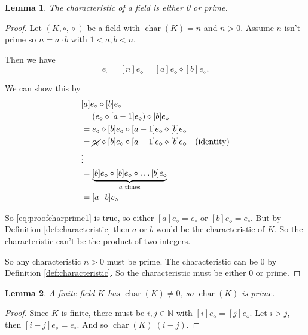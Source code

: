 \documentclass{article}
\newtheorem{lemma}{Lemma}
\newcommand{\NN}{\mathbb{N}}
\newcommand{\mchar}{\operatorname{char}}
\begin{document}
\begin{lemma}
    The characteristic of a field is either 0 or prime.
\end{lemma}

\begin{proof}
    Let $(K, \circ, \diamond)$ be a field with $\mchar(K) = n$ and
    $n > 0$. Assume $n$ isn't prime so $n = a \cdot b$ with $1 < a, b <n$.

    Then we have
    \begin{equation}\label{eq:proofcharprime1}
        e_\circ = [n]e_\diamond = [a]e_\diamond \diamond [b]e_\diamond.
    \end{equation}

    We can show this by
    \begin{align*}
          & [a] e_\diamond \diamond [b]e_\diamond                                             \\
          & = (e_\diamond \circ [a-1] e_\diamond) \diamond [b] e_\diamond                     \\
          & = e_\diamond \diamond [b]e_\diamond \circ [a-1] e_\diamond \diamond [b]e_\diamond \\
          & = \cancel{e_\diamond} \diamond [b]e_\diamond \circ [a-1] e_\diamond \diamond [b]e_\diamond & \mbox{(identity)} \\
          &\vdots \\
          & = \underbrace{[b] e_\diamond \circ [b] e_\diamond \circ \dots [b] e_\diamond}_\text{$a$ times} \\
          & = [a \cdot b] e_\diamond
    \end{align*}

    So \eqref{eq:proofcharprime1} is true, so either $[a]e_\diamond = e_\circ$ or $[b]e_\diamond = e_\circ$.
    But by Definition \ref{def:characteristic} then $a$ or $b$ would be the characteristic of $K$. So the
    characteristic can't be the product of two integers.

    So any characteristic $n > 0$ must be prime. The characteristic can be 0 by
    Definition \ref{def:characteristic}. So the characteristic must be either
    0 or prime.
\end{proof}

\begin{lemma}
    A finite field $K$ has $\mchar(K) \ne 0$, so $\mchar(K)$ is prime.
\end{lemma}
\begin{proof}
    Since $K$ is finite, there must be $i, j \in \NN$ with $[i]e_\diamond = [j]e_\diamond$.
    Let $i > j$, then $[i-j] e_\diamond = e_\circ$. And so $\mchar(K)|(i-j)$.
\end{proof}
\end{document}
